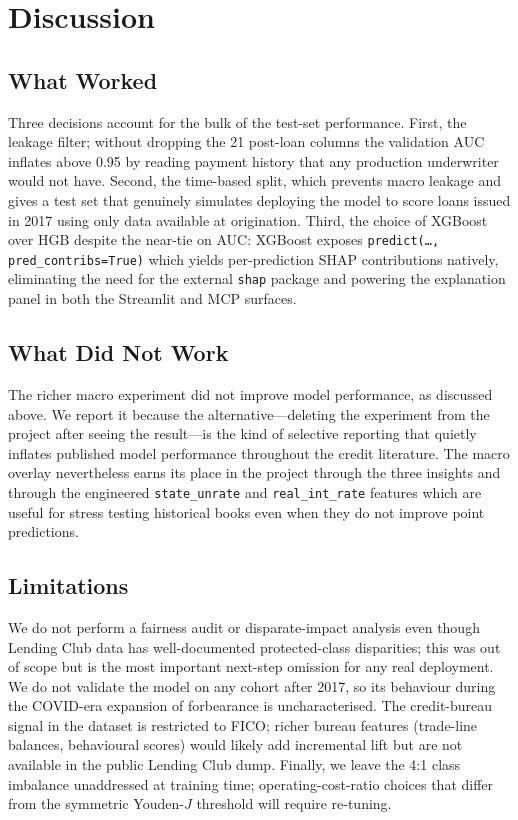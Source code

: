 \documentclass[conference]{IEEEtran}
\begin{document}
\section{Discussion}

\subsection{What Worked}

Three decisions account for the bulk of the test-set performance. First,
the leakage filter; without dropping the 21 post-loan columns the validation
AUC inflates above 0.95 by reading payment history that any production
underwriter would not have. Second, the time-based split, which prevents
macro leakage and gives a test set that genuinely simulates deploying the
model to score loans issued in 2017 using only data available at origination.
Third, the choice of XGBoost over HGB despite the near-tie on AUC: XGBoost
exposes \texttt{predict(\dots, pred\_contribs=True)} which yields
per-prediction SHAP contributions natively, eliminating the need for the
external \texttt{shap} package and powering the explanation panel in both
the Streamlit and MCP surfaces.

\subsection{What Did Not Work}

The richer macro experiment did not improve model performance, as discussed
above. We report it because the alternative---deleting the experiment from
the project after seeing the result---is the kind of selective reporting
that quietly inflates published model performance throughout the credit
literature. The macro overlay nevertheless earns its place in the project
through the three insights and through the engineered \texttt{state\_unrate}
and \texttt{real\_int\_rate} features which are useful for stress testing
historical books even when they do not improve point predictions.

\subsection{Limitations}

We do not perform a fairness audit or disparate-impact analysis even though
Lending Club data has well-documented protected-class disparities; this was
out of scope but is the most important next-step omission for any real
deployment. We do not validate the model on any cohort after 2017, so its
behaviour during the COVID-era expansion of forbearance is uncharacterised.
The credit-bureau signal in the dataset is restricted to FICO; richer bureau
features (trade-line balances, behavioural scores) would likely add
incremental lift but are not available in the public Lending Club dump.
Finally, we leave the 4:1 class imbalance unaddressed at training time;
operating-cost-ratio choices that differ from the symmetric Youden-$J$
threshold will require re-tuning.
\end{document}
